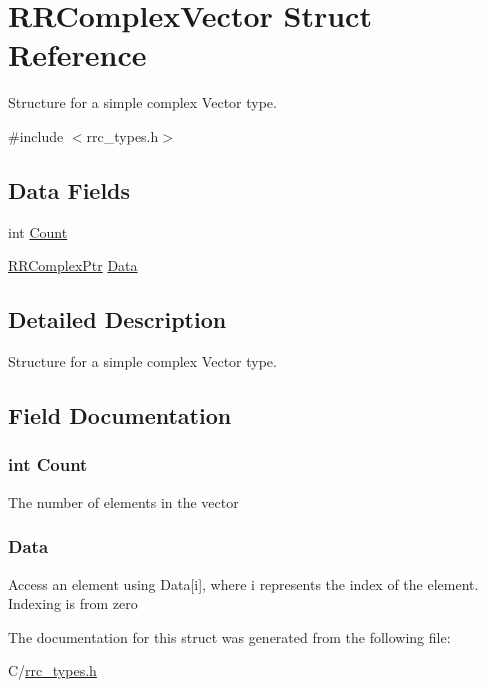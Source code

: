 \hypertarget{struct_r_r_complex_vector}{\section{R\-R\-Complex\-Vector Struct Reference}
\label{struct_r_r_complex_vector}
}


Structure for a simple complex Vector type.  




{\ttfamily \#include $<$rrc\-\_\-types.\-h$>$}

\subsection*{Data Fields}
\begin{DoxyCompactItemize}
\item 
int \hyperlink{struct_r_r_complex_vector_aad462966ed963f892117056de1eba502}{Count}
\item 
\hyperlink{rrc__types_8h_ada2046d7326c56ae29d8510fbf6622ee}{R\-R\-Complex\-Ptr} \hyperlink{struct_r_r_complex_vector_a2853286fc6b37960bba4c8871da839fa}{Data}
\end{DoxyCompactItemize}


\subsection{Detailed Description}
Structure for a simple complex Vector type. 

\subsection{Field Documentation}
\hypertarget{struct_r_r_complex_vector_aad462966ed963f892117056de1eba502}{
\subsubsection[{Count}]{\setlength{\rightskip}{0pt plus 5cm}int Count}}\label{struct_r_r_complex_vector_aad462966ed963f892117056de1eba502}
The number of elements in the vector \hypertarget{struct_r_r_complex_vector_a2853286fc6b37960bba4c8871da839fa}{
\subsubsection[{Data}]{ Data}}\label{struct_r_r_complex_vector_a2853286fc6b37960bba4c8871da839fa}
Access an element using Data\mbox{[}i\mbox{]}, where i represents the index of the element. Indexing is from zero 

The documentation for this struct was generated from the following file\-:\begin{DoxyCompactItemize}
\item 
C/\hyperlink{rrc__types_8h}{rrc\-\_\-types.\-h}\end{DoxyCompactItemize}
